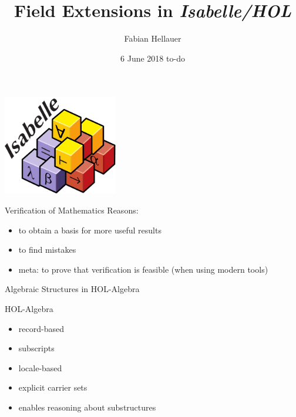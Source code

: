 \documentclass[%
	sans,
	12pt,
]{beamer}
\title{Field Extensions in \emph{Isabelle/HOL} \vspace*{-0.5em}}
\author{\normalsize Fabian Hellauer}
\institute[]{\footnotesize Technische Universität München}
\date{\footnotesize 6 June 2018 to-do}
\newcommand{\high}[1]{{\usebeamercolor[fg]{structure} #1}}
\begin{document}
\maketitle

\begin{frame}
\begin{center}
\includegraphics[width=5cm]{isabelle.pdf}
\end{center}
\end{frame}


\newcommand{\pivot}[1]{{\color{red}#1}}
\newcommand{\ltpiv}[1]{{\color{blue}#1}}
\newcommand{\gtpiv}[1]{{\color{olive}#1}}

\begin{frame}{Verification of Mathematics}%
Reasons:
\begin{itemize}
	\item to obtain a basis for more useful results\pause
	\item to find mistakes\pause
	\item meta: to prove that verification %
	is feasible (when using modern tools)
\end{itemize}
\end{frame}

\begin{frame}
\begin{center}
\huge\high{Algebraic Structures in HOL-Algebra}
\end{center}
\end{frame}

\begin{frame}{HOL-Algebra}
\begin{itemize}
	\item record-based \pause%
	\item subscripts \pause%
	\item locale-based \pause%
	\item explicit carrier sets \pause
	\item enables reasoning about substructures	\pause%
\end{itemize}
\end{frame}
\end{document}
